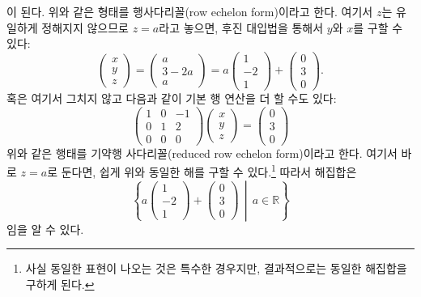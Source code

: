 \documentclass[unfonts,oneside,a4paper]{oblivoir}
\theoremstyle{definition}
\theoremstyle{theorem}
\theoremstyle{theorem}
\theoremstyle{remark}
\theoremstyle{remark}
\theoremstyle{remark}
\theoremstyle{remark}
\begin{document}
   이 된다.
   위와 같은 형태를 행사다리꼴(row echelon form)이라고 한다.
   여기서 $z$는 유일하게 정해지지 않으므로 $z = a$라고 놓으면, 후진 대입법을 통해서 $y$와 $x$를 구할 수 있다:
   \begin{equation*}
       \begin{pmatrix}
           x\\
           y\\
           z
       \end{pmatrix}
       =
       \begin{pmatrix}
           a\\
           3 - 2a\\
           a
       \end{pmatrix}
       =
       a
       \begin{pmatrix}
           1\\
           -2\\
           1
       \end{pmatrix}
       +
       \begin{pmatrix}
           0\\
           3\\
           0
       \end{pmatrix}.
   \end{equation*}
혹은 여기서 그치지 않고 다음과 같이 기본 행 연산을 더 할 수도 있다:
\begin{equation*}
    \begin{pmatrix}
        1 & 0 & -1\\
        0 & 1 & 2\\
        0 & 0 & 0
    \end{pmatrix}
    \begin{pmatrix}
        x\\
        y\\
        z
    \end{pmatrix}
    =
    \begin{pmatrix}
        0\\
        3\\
        0
    \end{pmatrix}
\end{equation*}
위와 같은 행태를 기약행 사다리꼴(reduced row echelon form)이라고 한다.
여기서 바로 $z = a$로 둔다면, 쉽게 위와 동일한 해를 구할 수 있다.\footnote{사실 동일한 표현이 나오는 것은 특수한 경우지만, 결과적으로는 동일한 해집합을 구하게 된다.}
따라서 해집합은
\begin{equation*}
    \left\{ a
    \begin{pmatrix}
        1\\
        -2\\
        1
    \end{pmatrix}
    +
    \begin{pmatrix}
        0\\
        3\\
        0
    \end{pmatrix}
    \,\middle|\, a \in \mathbb R
    \right\}
\end{equation*}
임을 알 수 있다.
\end{document}
